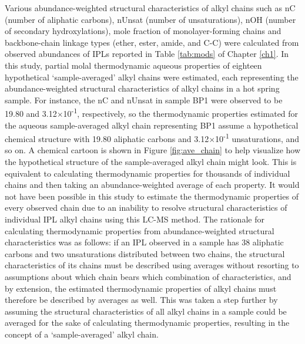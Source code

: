 Various abundance-weighted structural characteristics of alkyl chains such as nC (number of aliphatic carbons), nUnsat (number of unsaturations), nOH (number of secondary hydroxylations), mole fraction of monolayer-forming chains and backbone-chain linkage types (ether, ester, amide, and C-C) were calculated from observed abundances of IPLs reported in Table \ref{tab:mods} of Chapter \ref{ch1}. In this study, partial molal thermodynamic aqueous properties of eighteen hypothetical `sample-averaged' alkyl chains were estimated, each representing the abundance-weighted structural characteristics of alkyl chains in a hot spring sample. For instance, the nC and nUnsat in sample BP1 were observed to be 19.80 and 3.12$\times$10\textsuperscript{-1}, respectively, so the thermodynamic properties estimated for the aqueous sample-averaged alkyl chain representing BP1 assume a hypothetical chemical structure with 19.80 aliphatic carbons and 3.12$\times$10\textsuperscript{-1} unsaturations, and so on. A chemical cartoon is shown in Figure \ref{fig:ave_chain} to help visualize how the hypothetical structure of the sample-averaged alkyl chain might look. This is equivalent to calculating thermodynamic properties for thousands of individual chains and then taking an abundance-weighted average of each property. It would not have been possible in this study to estimate the thermodynamic properties of every observed chain due to an inability to resolve structural characteristics of individual IPL alkyl chains using this LC-MS method. The rationale for calculating thermodynamic properties from abundance-weighted structural characteristics was as follows: if an IPL observed in a sample has 38 aliphatic carbons and two unsaturations distributed between two chains, the structural characteristics of its chains must be described using averages without resorting to assumptions about which chain bears which combination of characteristics, and by extension, the estimated thermodynamic properties of alkyl chains must therefore be described by averages as well. This was taken a step further by assuming the structural characteristics of all alkyl chains in a sample could be averaged for the sake of calculating thermodynamic properties, resulting in the concept of a `sample-averaged' alkyl chain.

